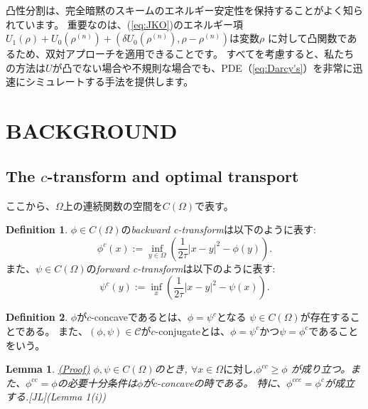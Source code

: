 \documentclass{jsarticle}
\newtheorem{lem}{Lemma}[section]
\theoremstyle{definition}
\newtheorem{dfn}{Definition}[section]
\begin{document}
凸性分割は、完全暗黙のスキームのエネルギー安定性を保持することがよく知られています。
重要なのは、(\ref{eq:JKO})のエネルギー項
$U_1(\rho) + U_0(\rho^{(n)}) + (\delta U_0(\rho^{(n)}), \rho - \rho^{(n)})$は変数$\rho$
に対して凸関数であるため、双対アプローチを適用できることです。
すべてを考慮すると、私たちの方法は$U$が凸でない場合や不規則な場合でも、PDE（\ref{eq:Darcy's}）を非常に迅速にシミュレートする手法を提供します。\\


\section{BACKGROUND}
\subsection{The $c$-transform and optimal transport}

ここから、$\Omega$上の連続関数の空間を$C(\Omega)$で表す。

\begin{dfn}
    $\phi \in C(\Omega)$の\textit{backward c-transform}は以下のように表す:
    \begin{equation}
        \label{def:backward-c-transform}
        \phi^c(x) := \inf_{y\in\Omega} \left(\frac{1}{2 \tau}|x - y|^2 - \phi(y)\right).
    \end{equation}
    また、$\psi \in C(\Omega)$の\textit{forward c-transform}は以下のように表す:
    \begin{equation}
        \label{def:forward-c-transform}
        \psi^c(y) := \inf_x \left( \frac{1}{2\tau}|x-y|^2 - \psi(x)\right).
    \end{equation}
\end{dfn}

\vspace\baselineskip

\begin{dfn}
    $\phi$が$c$-concaveであるとは、$\phi = \psi^c$となる $\psi \in C(\Omega)$が存在することである。
    また、$(\phi, \psi) \in \mathcal{C}$が$c$-conjugateとは、$\phi = \psi^c$かつ$\psi = \phi^c$であることをいう。
\end{dfn}

\vspace\baselineskip

\begin{lem}
    \label{lem:c-transform}
    \hyperlink{proof:lem:c-transform}{(Proof)}
    $\phi, \psi \in C(\Omega)$のとき,
    $\forall x \in \Omega \text{に対し,}\phi^{cc} \ge \phi$
    が成り立つ。また、$\phi^{cc} = \phi$の必要十分条件は$\phi$が$c$-concaveの時である。
    特に、$\phi^{ccc} = \phi^c$が成立する.[JL](Lemma 1(i))
\end{lem}
\end{document}
